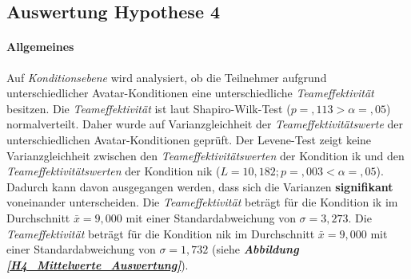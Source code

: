 \documentclass[a4paper,11pt]{article}%
\renewcommand{\\}{\vspace*{0.5\baselineskip} \newline}
\begin{document}
{\newpage
\subsection{Auswertung Hypothese 4}
\label{Auswertung Hypothese 4}

\paragraph{Allgemeines}
Auf \textit{Konditionsebene} wird analysiert, ob die Teilnehmer aufgrund unterschiedlicher Avatar-Konditionen eine unterschiedliche \textit{Teameffektivität} besitzen.\\
Die \textit{Teameffektivität} ist laut Shapiro-Wilk-Test ($p =,113 > \alpha = ,05$) normalverteilt. Daher wurde auf Varianzgleichheit der \textit{Teameffektivitätswerte} der unterschiedlichen Avatar-Konditionen geprüft. Der Levene-Test zeigt keine Varianzgleichheit zwischen den \textit{Teameffektivitätswerten} der Kondition \ac{ik} und den \textit{Teameffektivitätswerten} der Kondition \ac{nik} ($L = 10,182; p=,003 < \alpha = ,05$). Dadurch kann davon ausgegangen werden, dass sich die Varianzen \textbf{signifikant} voneinander unterscheiden. \\
Die \textit{Teameffektivität} beträgt für die Kondition \ac{ik} im Durchschnitt $\bar{x} = 9,000$ mit einer Standardabweichung von $\sigma = 3,273$.\newline 
Die \textit{Teameffektivität} beträgt für die Kondition \ac{nik} im Durchschnitt $\bar{x} = 9,000$ mit einer Standardabweichung von $\sigma = 1,732$ (siehe \textbf{\textit{Abbildung \ref{H4_Mittelwerte_Auswertung}}}).


}
\end{document}
